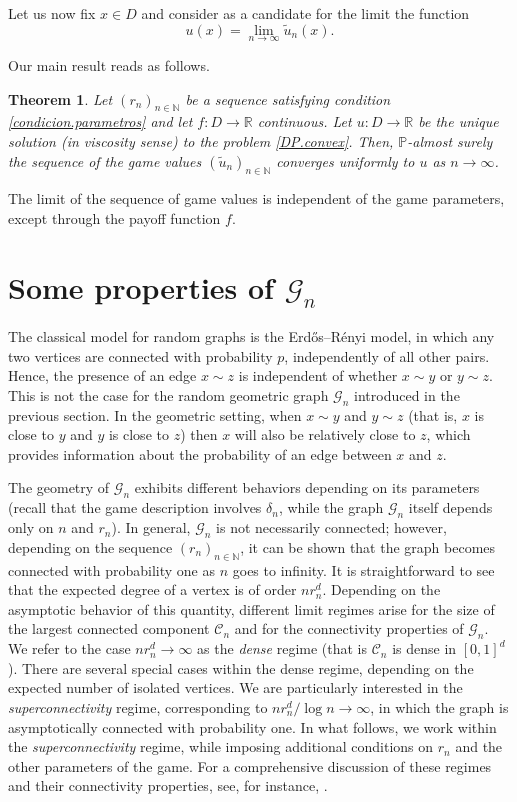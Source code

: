 \documentclass[11pt]{amsart}
\newtheorem{theorem}{Theorem}
\theoremstyle{definition}
\theoremstyle{remark}
\numberwithin{equation}{section}
\newcommand{\R}{{\mathbb R}}
\newcommand{\N}{{\mathbb N}}
\renewcommand{\P}{\mathbb{P}}
\newcommand{\G}{\mathcal{G}}
\newcommand{\C}{{\mathcal C}}
\begin{document}
Let us now fix $x\in D$ and consider as a candidate for the limit the function
\[
u(x) = \lim_{n\to\infty} \tilde u_n(x).
\]


Our main result reads as follows.


\begin{theorem}
\label{game.value.convergence}
Let $(r_n)_{n\in\mathbb{N}}$ be a sequence satisfying condition \eqref{condicion.parametros} and let $f\colon D\to \R$ continuous.
Let $u\colon D\to \R$ be the unique solution (in viscosity sense) to the problem \eqref{DP.convex}.
Then, $\P$-almost surely the sequence of the game values $(\tilde{u}_n)_{n\in \N}$ converges uniformly to $u$ as $n \to \infty$.
\end{theorem}

The limit of the sequence of game values is independent of the game parameters, except through the payoff function $f$.


\section{Some properties of \texorpdfstring{$\G_n$}{Gn}}
\label{section.graph}


The classical model for random graphs is the Erd\H{o}s--Rényi model, in which any two vertices are connected with probability $p$, independently of all other pairs. 
Hence, the presence of an edge $x\sim z$ is independent of whether $x\sim y$ or $y\sim z$. 
This is not the case for the random geometric graph $\G_n$ introduced in the previous section.
In the geometric setting, when $x\sim y$ and $y\sim z$ (that is, $x$ is close to $y$ and $y$ is close to $z$) then $x$ will also be relatively close to $z$, which provides information about the probability of an edge between $x$ and $z$.


The geometry of $\G_n$ exhibits different behaviors depending on its parameters (recall that the game description involves $\delta_n$, while the graph $\G_n$ itself depends only on $n$ and $r_n$). 
In general, $\G_n$ is not necessarily connected; however, depending on the sequence $(r_n)_{n\in\N}$, it can be shown that the graph becomes connected with probability one as $n$ goes to infinity. 
It is straightforward to see that the expected degree of a vertex is of order $nr_n^d$. Depending on the asymptotic behavior of this quantity, different limit regimes arise for the size of the largest connected component $\C_n$  and for the connectivity properties of $\G_n$. 
We refer to the case $nr_n^d\to\infty$ as the \emph{dense} regime (that is $\C_n$ is dense in $[0,1]^d$). 
There are several special cases within the dense regime, depending on the expected number of isolated vertices. 
We are particularly interested in the \emph{superconnectivity} regime, corresponding to $nr_n^d/\log n \to \infty$, in which the graph is asymptotically connected with probability one. 
In what follows, we work within the \emph{superconnectivity} regime, while imposing additional conditions on $r_n$ and the other parameters of the game. 
For a comprehensive discussion of these regimes and their connectivity properties, see, for instance, \cite{penrose}.
\end{document}
